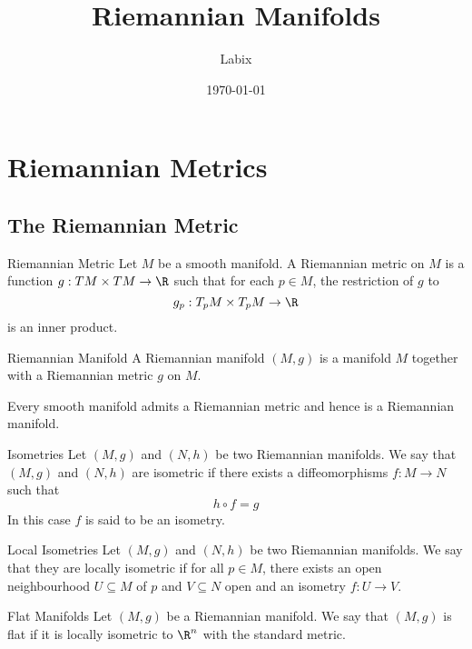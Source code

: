 \documentclass[a4paper]{article}
\title{Riemannian Manifolds}
\author{Labix}
\date{\today}
\begin{document}
\maketitle
\begin{abstract}
\end{abstract}
\pagebreak
\tableofcontents
\pagebreak

\section{Riemannian Metrics}
\subsection{The Riemannian Metric}
\begin{defn}{Riemannian Metric}{} Let $M$ be a smooth manifold. A Riemannian metric on $M$ is a function $g: TM\times TM\to\R$ such that for each $p\in M$, the restriction of $g$ to $$g_p:T_pM\times T_pM\to\R$$ is an inner product. 
\end{defn}

\begin{defn}{Riemannian Manifold}{} A Riemannian manifold $(M,g)$ is a manifold $M$ together with a Riemannian metric $g$ on $M$. 
\end{defn}

\begin{thm}{}{} Every smooth manifold admits a Riemannian metric and hence is a Riemannian manifold. 
\end{thm}

\begin{defn}{Isometries}{} Let $(M,g)$ and $(N,h)$ be two Riemannian manifolds. We say that $(M,g)$ and $(N,h)$ are isometric if there exists a diffeomorphisms $f:M\to N$ such that $$h\circ f=g$$ In this case $f$ is said to be an isometry. 
\end{defn}

\begin{defn}{Local Isometries}{} Let $(M,g)$ and $(N,h)$ be two Riemannian manifolds. We say that they are locally isometric if for all $p\in M$, there exists an open neighbourhood $U\subseteq M$ of $p$ and $V\subseteq N$ open and an isometry $f:U\to V$. 
\end{defn}

\begin{defn}{Flat Manifolds}{} Let $(M,g)$ be a Riemannian manifold. We say that $(M,g)$ is flat if it is locally isometric to $\R^n$ with the standard metric. 
\end{defn}
\end{document}

